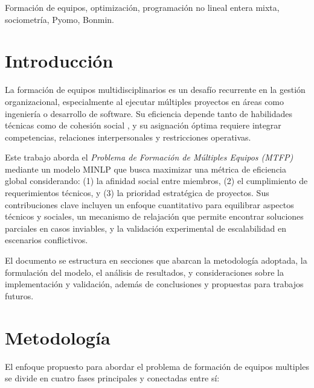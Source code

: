 \documentclass[conference]{IEEEtran}
\begin{document}
\begin{IEEEkeywords}
    Formación de equipos, optimización, programación no lineal entera mixta, sociometría, Pyomo, Bonmin.
\end{IEEEkeywords}

\section{Introducción}
La formación de equipos multidisciplinarios es un desafío recurrente en la gestión organizacional, especialmente al ejecutar múltiples proyectos en áreas como ingeniería o desarrollo de software. Su eficiencia depende tanto de habilidades técnicas como de cohesión social \cite{gutierrez2016multiple}, y su asignación óptima requiere integrar competencias, relaciones interpersonales y restricciones operativas.

Este trabajo aborda el \textit{Problema de Formación de Múltiples Equipos (MTFP)} mediante un modelo MINLP que busca maximizar una métrica de eficiencia global considerando: (1) la afinidad social entre miembros, (2) el cumplimiento de requerimientos técnicos, y (3) la prioridad estratégica de proyectos. Sus contribuciones clave incluyen un enfoque cuantitativo para equilibrar aspectos técnicos y sociales, un mecanismo de relajación que permite encontrar soluciones parciales en casos inviables, y la validación experimental de escalabilidad en escenarios conflictivos.

El documento se estructura en secciones que abarcan la metodología adoptada, la formulación del modelo, el análisis de resultados, y consideraciones sobre la implementación y validación, además de conclusiones y propuestas para trabajos futuros.

\section{Metodología}

El enfoque propuesto para abordar el problema de formación de equipos multiples se divide en cuatro fases principales y conectadas entre sí:
\end{document}
